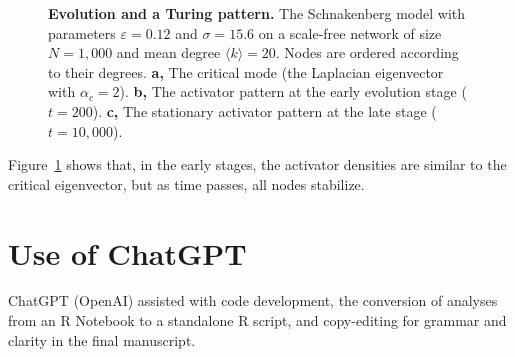 \begin{figure}[H]
  \caption{\textbf{Evolution and a Turing pattern.} The Schnakenberg model with parameters \(\varepsilon=0.12\) and \(\sigma=15.6\) on a scale-free
network of size \(N=1{,}000\) and mean degree \(\langle k\rangle=20\). Nodes are ordered according to their degrees. \textbf{a,} The critical mode (the Laplacian eigenvector with
\(\alpha_c = 2\)). \textbf{b,} The activator pattern at the early evolution stage (\(t=200\)). \textbf{c,} The stationary activator pattern at the late stage (\(t=10{,}000\)).}
\label{fig:sch_evolution}
\end{figure}

Figure~\ref{fig:sch_evolution} shows that, in the early stages, the activator densities are similar to the critical eigenvector, but as time passes, all nodes stabilize.

\section{Use of ChatGPT}

ChatGPT (OpenAI) assisted with code development, the conversion of analyses from an R Notebook to a standalone R script, and copy-editing for grammar and clarity in the final manuscript.